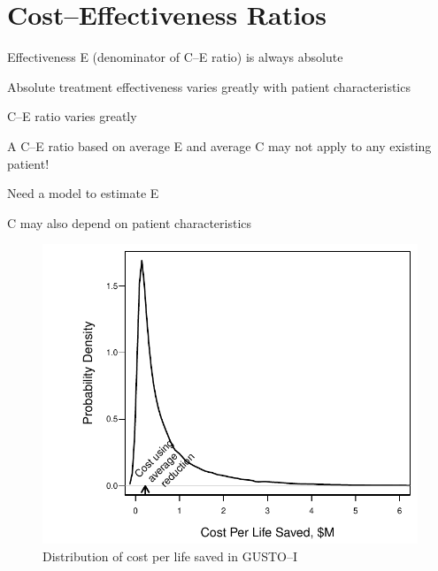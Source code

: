 \section{Cost--Effectiveness Ratios}
\bi
\item   Effectiveness E (denominator of C--E ratio) is always absolute
\item   Absolute treatment effectiveness varies greatly with patient
        characteristics
\item   \ra C--E ratio varies greatly
\item   A C--E ratio based on average E and average C
        may not apply to any existing patient!
\item   Need a model to estimate E
\item   C may also depend on patient characteristics
\begin{Schunk}
\begin{figure}[htbp]

\centerline{\includegraphics{ancova-gusto-histcost-1} }

\caption[Distribution of cost per life saved in GUSTO--I]{Distribution of cost per life saved in GUSTO--I}\label{fig:ancova-gusto-histcost}
\end{figure}
\end{Schunk}
\ei

